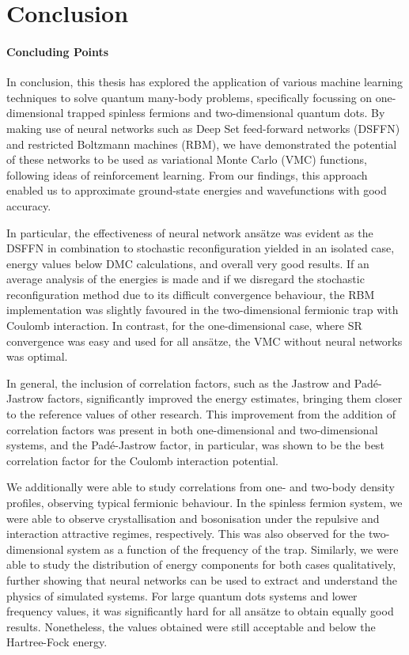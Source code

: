 \chapter{Conclusion}\label{sec:conclusion}
\subsubsection{Concluding Points}

In conclusion, this thesis has explored the application of various machine learning techniques to solve quantum many-body problems, specifically focussing on one-dimensional trapped spinless fermions and two-dimensional quantum dots. By making use of neural networks such as Deep Set feed-forward networks (DSFFN) and restricted Boltzmann machines (RBM), we have demonstrated the potential of these networks to be used as variational Monte Carlo (VMC) functions, following ideas of reinforcement learning. From our findings, this approach enabled us to approximate ground-state energies and wavefunctions with good accuracy.

In particular, the effectiveness of neural network ansätze was evident as the DSFFN in combination to stochastic reconfiguration yielded in an isolated case, energy values below DMC calculations, and overall very good results. If an average analysis of the energies is made and if we disregard the stochastic reconfiguration method due to its difficult convergence behaviour, the RBM implementation was slightly favoured in the two-dimensional fermionic trap with Coulomb interaction. In contrast, for the one-dimensional case, where SR convergence was easy and used for all ansätze, the VMC without neural networks was optimal.

In general, the inclusion of correlation factors, such as the Jastrow and Padé-Jastrow factors, significantly improved the energy estimates, bringing them closer to the reference values of other research. This improvement from the addition of correlation factors was present in both one-dimensional and two-dimensional systems, and the Padé-Jastrow factor, in particular, was shown to be the best correlation factor for the Coulomb interaction potential.

We additionally were able to study correlations from one- and two-body density profiles, observing typical fermionic behaviour. In the spinless fermion system, we were able to observe crystallisation and bosonisation under the repulsive and interaction attractive regimes, respectively. This was also observed for the two-dimensional system as a function of the frequency of the trap. Similarly, we were able to study the distribution of energy components for both cases qualitatively, further showing that neural networks can be used to extract and understand the physics of simulated systems. For large quantum dots systems and lower frequency values, it was significantly hard for all ansätze to obtain equally good results. Nonetheless, the values obtained were still acceptable and below the Hartree-Fock energy.

